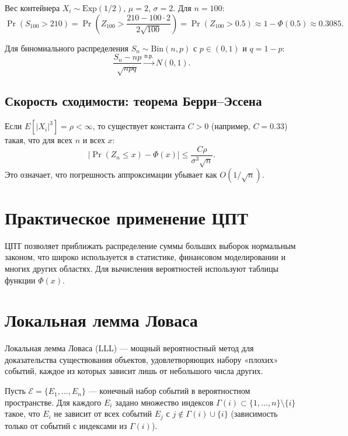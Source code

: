 \documentclass[10pt]{article}
\begin{document}
\begin{example}
Вес контейнера $X_i \sim \text{Exp}(1/2)$, $\mu = 2$, $\sigma = 2$. Для $n=100$:
\[
\Pr(S_{100} > 210) = \Pr\!\left(Z_{100} > \frac{210 - 100\cdot2}{2\sqrt{100}}\right) = \Pr(Z_{100} > 0.5) \approx 1 - \Phi(0.5) \approx 0.3085.
\]
\end{example}

\begin{theorem}
Для биномиального распределения $S_n \sim \text{Bin}(n,p)$ с $p \in (0,1)$ и $q=1-p$:
\[
\frac{S_n - np}{\sqrt{npq}} \xrightarrow{\text{п.р.}} N(0,1).
\]
\end{theorem}

\subsection{Скорость сходимости: теорема Берри–Эссена}
Если $E[|X_i|^3] = \rho < \infty$, то существует константа $C>0$ (например, $C=0.33$) такая, что для всех $n$ и всех $x$:
\[
\bigl|\Pr(Z_n \le x) - \Phi(x)\bigr| \le \frac{C\rho}{\sigma^3\sqrt{n}}.
\]
Это означает, что погрешность аппроксимации убывает как $O(1/\sqrt{n})$.

\section{Практическое применение ЦПТ}
ЦПТ позволяет приближать распределение суммы больших выборок нормальным законом, что широко используется в статистике, финансовом моделировании и многих других областях. Для вычисления вероятностей используют таблицы функции $\Phi(x)$.

\section{Локальная лемма Ловаса}
Локальная лемма Ловаса (LLL) — мощный вероятностный метод для доказательства существования объектов, удовлетворяющих набору «плохих» событий, каждое из которых зависит лишь от небольшого числа других.

\begin{definition}
Пусть $\mathcal{E} = \{E_1, \dots, E_n\}$ — конечный набор событий в вероятностном пространстве. Для каждого $E_i$ задано множество индексов $\Gamma(i) \subset \{1,\dots,n\} \setminus \{i\}$ такое, что $E_i$ не зависит от всех событий $E_j$ с $j \notin \Gamma(i) \cup \{i\}$ (зависимость только от событий с индексами из $\Gamma(i)$).
\end{definition}
\end{document}
